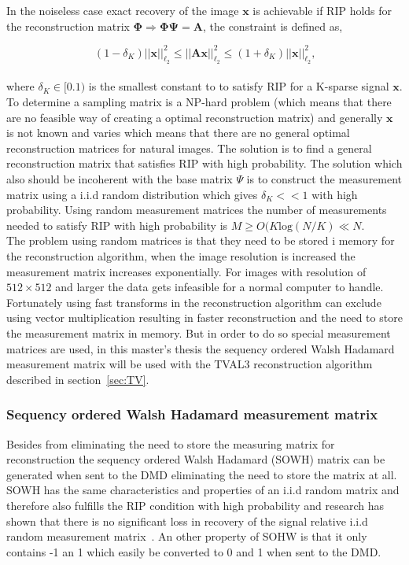 In the noiseless case exact recovery of the image $\mathbf{x}$ is achievable if RIP holds for the reconstruction matrix $\mathbf{\Phi} \Rightarrow \mathbf{\Phi\Psi = A}$, the constraint is defined as,

\begin{equation}
    (1-\delta_K)||\mathbf{x}||_{\ell_2}^2\leq||\mathbf{Ax}||_{\ell_2}^2\leq(1+\delta_K)||\mathbf{x}||_{\ell_2}^2 \text{,}
\end{equation}\\[0.1in]

where $\delta_K \in [0.1)$ is the smallest constant to to satisfy RIP for a K-sparse signal $\mathbf{x}$. To determine a sampling matrix is a NP-hard problem (which means that there are no feasible way of creating a optimal reconstruction matrix) and generally $\textbf{x}$ is not known and varies which means that there are no general optimal reconstruction matrices for natural images. The solution is to find a general reconstruction matrix that satisfies RIP with high probability. The solution which also should be incoherent with the base matrix $\Psi$ is to construct the measurement matrix using a i.i.d random distribution which gives $\delta_K << 1$ with high probability. Using random measurement matrices the number of measurements needed to satisfy RIP with high probability is $M \geq O(K\text{log}(N/K) \ll N$.\\[0.1in]

The problem using random matrices is that they need to be stored i memory for the reconstruction algorithm, when the image resolution is increased the measurement matrix increases exponentially. For images with resolution of $512\times 512$ and larger the data gets infeasible for a normal computer to handle.  Fortunately using fast transforms in the reconstruction algorithm can exclude using vector multiplication resulting in faster reconstruction and the need to store the measurement matrix in memory. But in order to do so special measurement matrices are used, in this master's thesis the sequency ordered Walsh Hadamard measurement matrix will be used with the TVAL3 reconstruction algorithm described in section~\ref{sec:TV}.   


\subsubsection{Sequency ordered Walsh Hadamard measurement matrix}
\label{sec:SOWHMM}
Besides from eliminating the need to store the measuring matrix for reconstruction the sequency ordered Walsh Hadamard (SOWH) matrix can be generated when sent to the DMD eliminating the need to store the matrix at all. SOWH has the same characteristics and properties of an i.i.d random matrix and therefore also fulfills the RIP condition with high probability and research has shown that there is no significant loss in recovery of the signal relative i.i.d random measurement matrix~\cite{article:an_improved_WH_matrix}.  An other property of SOHW is that it only contains -1 an 1 which easily be converted to 0 and 1 when sent to the DMD. \\[0.1in]


